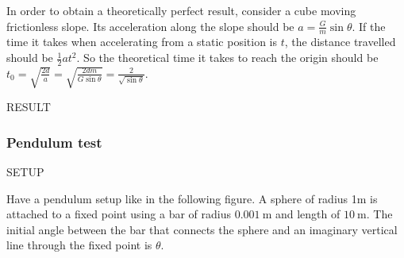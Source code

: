 \documentclass[runningheads]{llncs}
\begin{document}
\begin{itemize}
In order to obtain a theoretically perfect result, consider a cube moving frictionless slope. Its acceleration along the slope should be $a=\frac{G}{m}\sin \theta$. If the time it takes when accelerating from a static position is $t$, the distance travelled should be $\frac{1}{2}at^2$. So the theoretical time it takes to reach the origin should be $t_0=\sqrt{\frac{2d}{a}}=\sqrt{\frac{2dm}{G\sin \theta}}=\frac{2}{\sqrt{\sin\theta}}$.

\begin{center}
\end{center}

RESULT


\subsubsection{Pendulum test}

SETUP

Have a pendulum setup like in the following figure.
A sphere of radius 1m is attached to a fixed point using a bar of radius $\SI{0.001}{\m}$ and length of $\SI{10}{\m}$.
The initial angle between the bar that connects the sphere and an imaginary vertical line through the fixed point is $\theta$.

\begin{center}
  \end{center}


\end{itemize}
\end{document}

